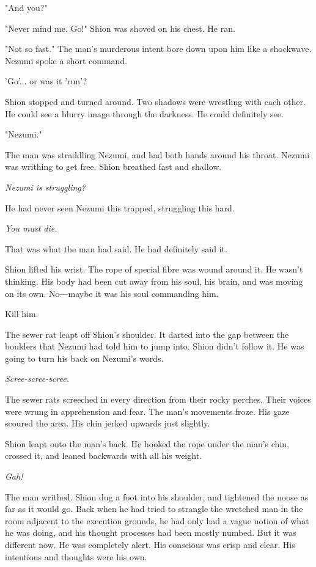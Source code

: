 "And you?"

"Never mind me. Go!" Shion was shoved on his chest. He ran.

"Not so fast." The man's murderous intent bore down upon him like a
shockwave. Nezumi spoke a short command.

'Go'... or was it 'run'?

Shion stopped and turned around. Two shadows were wrestling with each
other. He could see a blurry image through the darkness. He could
definitely see.

"Nezumi."

The man was straddling Nezumi, and had both hands around his throat.
Nezumi was writhing to get free. Shion breathed fast and shallow.

\emph{Nezumi is struggling?}

He had never seen Nezumi this trapped, struggling this hard.

\emph{You must die.}

That was what the man had said. He had definitely said it.

Shion lifted his wrist. The rope of special fibre was wound around it.
He wasn't thinking. His body had been cut away from his soul, his brain,
and was moving on its own. No―maybe it was his soul commanding him.

Kill him.

The sewer rat leapt off Shion's shoulder. It darted into the gap between
the boulders that Nezumi had told him to jump into. Shion didn't follow
it. He was going to turn his back on Nezumi's words.

\emph{Scree-scree-scree.}

The sewer rats screeched in every direction from their rocky perches.
Their voices were wrung in apprehension and fear. The man's movements
froze. His gaze scoured the area. His chin jerked upwards just slightly.

Shion leapt onto the man's back. He hooked the rope under the man's
chin, crossed it, and leaned backwards with all his weight.

\emph{Gah!}

The man writhed. Shion dug a foot into his shoulder, and tightened the
noose as far as it would go. Back when he had tried to strangle the
wretched man in the room adjacent to the execution grounds, he had only
had a vague notion of what he was doing, and his thought processes had
been mostly numbed. But it was different now. He was completely alert.
His conscious was crisp and clear. His intentions and thoughts were his
own.


